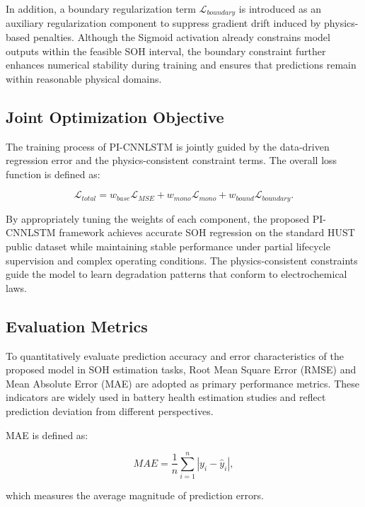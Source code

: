 \documentclass[a4paper,fleqn]{cas-dc}
\begin{document}
In addition, a boundary regularization term $\mathcal{L}_{boundary}$ is introduced as an auxiliary regularization component to suppress gradient drift induced by physics-based penalties. Although the Sigmoid activation already constrains model outputs within the feasible SOH interval, the boundary constraint further enhances numerical stability during training and ensures that predictions remain within reasonable physical domains.

\subsection{Joint Optimization Objective}
\label{subsec:joint_loss}

The training process of PI-CNNLSTM is jointly guided by the data-driven regression error and the physics-consistent constraint terms. The overall loss function is defined as:

\begin{equation}
\mathcal{L}_{total}
=
w_{base}\mathcal{L}_{MSE}
+
w_{mono}\mathcal{L}_{mono}
+
w_{bound}\mathcal{L}_{boundary}.
\end{equation}

By appropriately tuning the weights of each component, the proposed PI-CNNLSTM framework achieves accurate SOH regression on the standard HUST public dataset while maintaining stable performance under partial lifecycle supervision and complex operating conditions. The physics-consistent constraints guide the model to learn degradation patterns that conform to electrochemical laws.

\subsection{Evaluation Metrics}
\label{subsec:metrics}

To quantitatively evaluate prediction accuracy and error characteristics of the proposed model in SOH estimation tasks, Root Mean Square Error (RMSE) and Mean Absolute Error (MAE) are adopted as primary performance metrics. These indicators are widely used in battery health estimation studies and reflect prediction deviation from different perspectives.

MAE is defined as:

\begin{equation}
MAE =
\frac{1}{n}
\sum_{i=1}^{n}
\left| y_i - \hat{y}_i \right|,
\end{equation}

which measures the average magnitude of prediction errors.
\end{document}
